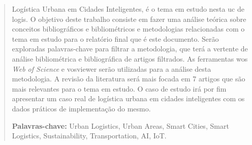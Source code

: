 
\begin{abstract}
Logística Urbana em Cidades Inteligentes, é o tema em estudo nesta \gls{uc} de \gls{logis}.
O objetivo deste trabalho consiste em fazer uma análise teórica sobre conceitos bibliográficos e bibliométricos e metodologias relacionadas com o tema em estudo para o relatório final que é este documento.
Serão exploradas palavras-chave para filtrar a metodologia, que terá a vertente de análise bibliométrica e bibliográfica de artigos filtrados.
As ferramentas \gls{wos} \textit{Web of Science} e \gls{vosviewer} serão utilizadas para a análise desta metodologia.
A revisão da literatura será mais focada em 7 artigos que são mais relevantes para o tema em estudo.
O caso de estudo irá por fim apresentar um caso real de logística urbana em cidades inteligentes com os dados práticos de implementação do mesmo.



\vspace{5cm}
\textbf{Palavras-chave:}
Urban Logistics, Urban Areas, Smart Cities, Smart Logistics, Sustainability, Transportation, AI, IoT.

\end{abstract}